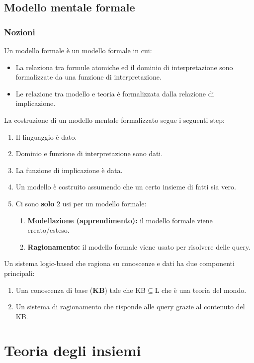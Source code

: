 \documentclass{book}
\begin{document}
    \section{Modello mentale formale}
    \subsection{Nozioni}
    Un modello formale è un modello formale in cui:
    \begin{itemize}
        \item La relaziona tra formule atomiche ed il dominio di interpretazione sono formalizzate da una funzione di interpretazione.
        \item Le relazione tra modello e teoria è formalizzata dalla relazione di implicazione.
    \end{itemize}
    La costruzione di un modello mentale formalizzato segue i seguenti step:
    \begin{enumerate}
        \item Il linguaggio è dato.
        \item Dominio e funzione di interpretazione sono dati.
        \item La funzione di implicazione è data.
        \item Un modello è costruito assumendo che un certo insieme di fatti sia vero.
        \item Ci sono \textbf{solo} 2 usi per un modello formale:
        \begin{enumerate}
            \item \textbf{Modellazione (apprendimento):} il modello formale viene creato/esteso.
            \item \textbf{Ragionamento:} il modello formale viene usato per risolvere delle query.
        \end{enumerate}
    \end{enumerate}
    Un sistema logic-based che ragiona su conoscenze e dati ha due componenti principali:
    \begin{enumerate}
        \item Una conoscenza di base (\textbf{KB}) tale che KB$\subseteq$L che è una teoria del mondo.
        \item Un sistema di ragionamento che risponde alle query grazie al contenuto del KB.
    \end{enumerate}

    \chapter{Teoria degli insiemi}
\end{document}
